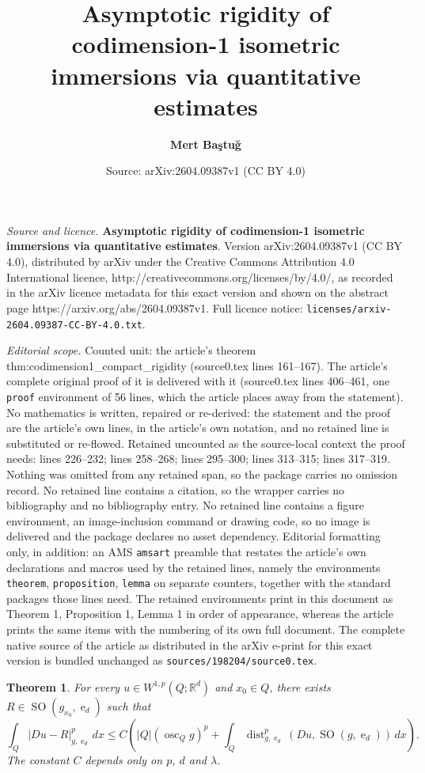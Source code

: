 \documentclass[10pt,a4paper]{amsart}
\title{\textbf{Asymptotic rigidity of codimension-1 isometric immersions via quantitative estimates}}
\author{\textbf{Mert Baştuğ}}
\date{Source: arXiv:2604.09387v1 (CC BY 4.0)}
\newtheorem{theorem}{Theorem}
\DeclareMathOperator{\SO}{SO}
\DeclareMathOperator{\dist}{dist}
\DeclareMathOperator{\e}{e}
\DeclareMathOperator*{\osc}{osc}
\begin{document}
\maketitle

\noindent\emph{Source and licence.} \textbf{Asymptotic rigidity of codimension-1 isometric immersions via quantitative estimates}. Version arXiv:2604.09387v1 (CC BY 4.0), distributed by arXiv under the Creative Commons Attribution 4.0 International licence, http://creativecommons.org/licenses/by/4.0/, as recorded in the arXiv licence metadata for this exact version and shown on the abstract page https://arxiv.org/abs/2604.09387v1. Full licence notice: \texttt{licenses/arxiv-2604.09387-CC-BY-4.0.txt}.\par\smallskip

\noindent\textit{Editorial scope.} Counted unit: the article's theorem thm:codimension1\_compact\_rigidity (source0.tex lines 161--167). The article's complete original proof of it is delivered with it (source0.tex lines 406--461, one \texttt{proof} environment of 56 lines, which the article places away from the statement). No mathematics is written, repaired or re-derived: the statement and the proof are the article's own lines, in the article's own notation, and no retained line is substituted or re-flowed.  Retained uncounted as the source-local context the proof needs: lines 226--232; lines 258--268; lines 295--300; lines 313--315; lines 317--319.  Nothing was omitted from any retained span, so the package carries no omission record.  No retained line contains a citation, so the wrapper carries no bibliography and no bibliography entry.  No retained line contains a figure environment, an image-inclusion command or drawing code, so no image is delivered and the package declares no asset dependency.  Editorial formatting only, in addition: an AMS \texttt{amsart} preamble that restates the article's own declarations and macros used by the retained lines, namely the environments \texttt{theorem}, \texttt{proposition}, \texttt{lemma} on separate counters, together with the standard packages those lines need.  The retained environments print in this document as Theorem 1, Proposition 1, Lemma 1 in order of appearance, whereas the article prints the same items with the numbering of its own full document.  The complete native source of the article as distributed in the arXiv e-print for this exact version is bundled unchanged as \texttt{sources/198204/source0.tex}.
\begin{theorem} \label{thm:noneuclidean_rigidity}
    For every $u \in W^{1, p}(Q; \mathbb{R}^d)$ and $x_0 \in Q$, there exists $R \in \SO(g_{x_0}, \e_d)$ such that
    \[
    \int_Q |Du - R|_{g, \e_d}^p \, dx \le C\left(|Q|\left(\osc_Q g\right)^p + \int_Q \dist_{g, \e_d}^p(Du, \SO(g, \e_d)) \, dx\right).
    \]
    The constant $C$ depends only on $p$, $d$ and $\lambda$.
\end{theorem}
\end{document}
